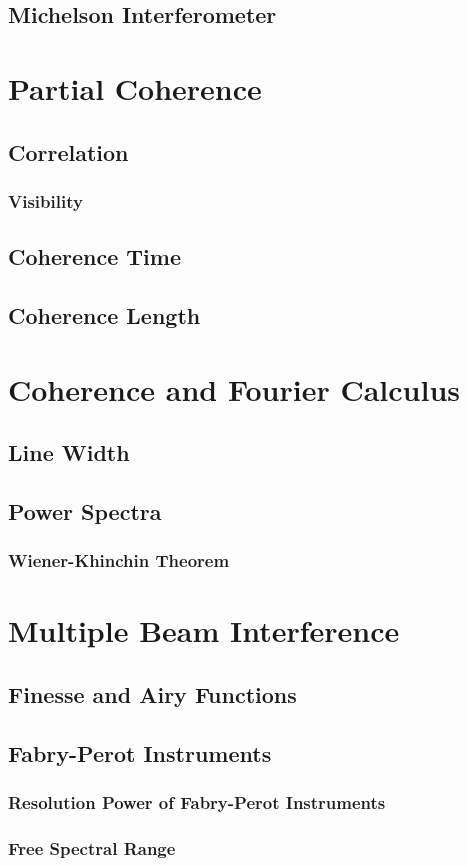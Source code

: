 \documentclass[../electromagnetism.tex]{subfiles}
\begin{document}
\subsection{Michelson Interferometer}
\section{Partial Coherence}
\subsection{Correlation}
\subsubsection{Visibility}
\subsection{Coherence Time}
\subsection{Coherence Length}
\section{Coherence and Fourier Calculus}
\subsection{Line Width}
\subsection{Power Spectra}
\subsubsection{Wiener-Khinchin Theorem}
\section{Multiple Beam Interference}
\subsection{Finesse and Airy Functions}
\subsection{Fabry-Perot Instruments}
\subsubsection{Resolution Power of Fabry-Perot Instruments}
\subsubsection{Free Spectral Range}
\end{document}
